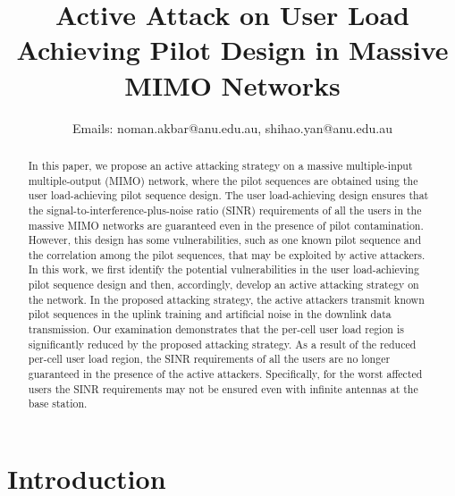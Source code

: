\documentclass[conference]{IEEEtran}
\begin{document}
\title{Active Attack on User Load Achieving Pilot Design in Massive MIMO Networks}

\author{
Emails: noman.akbar@anu.edu.au, shihao.yan@anu.edu.au}


\maketitle

\begin{abstract}
In this paper, we propose an active attacking strategy on a massive multiple-input multiple-output (MIMO) network, where the pilot sequences are obtained using the user load-achieving pilot sequence design. The user load-achieving design ensures that the signal-to-interference-plus-noise ratio (SINR) requirements of all the users in the massive MIMO networks are guaranteed even in the presence of pilot contamination. However, this design has some vulnerabilities, such as one known pilot sequence and the correlation among the pilot sequences, that may be exploited by active attackers. In this work, we first identify the potential vulnerabilities in the user load-achieving pilot sequence design and then, accordingly, develop an active attacking strategy on the network. In the proposed attacking strategy, the active attackers transmit known pilot sequences in the uplink training and artificial noise in the downlink data transmission. Our examination demonstrates that the per-cell user load region is significantly reduced by the proposed attacking strategy. As a result of the reduced per-cell user load region, the SINR requirements of all the users are no longer guaranteed in the presence of the active attackers. Specifically, for the worst affected users the SINR requirements may not be ensured even with infinite antennas at the base station.
\end{abstract}


\IEEEpeerreviewmaketitle

\section{Introduction}\label{sec:intro}
\end{document}
